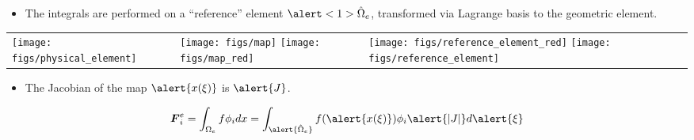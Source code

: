 \begin{frame}[t]
  \begin{block}{}
    \begin{itemize}    
  \item{
    The integrals are performed on a ``reference'' element $\alert<1>{\hat{\Omega}_e}$, transformed via Lagrange basis to the geometric element.
    }
  \end{itemize}
  \end{block}\vspace{-.3in}
  \begin{center}
  \begin{tabular}{lll} \\ 
      \texttt{[image: figs/physical\_element]}
       &
  {
       \texttt{[image: figs/map]}
  }
  {
       \texttt{[image: figs/map\_red]}
  }
       &
  {
       \texttt{[image: figs/reference\_element\_red]}
       }
  {
       \texttt{[image: figs/reference\_element]}
       }
     \end{tabular}
  \end{center}


      {
	\begin{block}{}
	\begin{itemize}    
	\item{
	  The Jacobian of the map $\alert{x(\xi)}$ is $\alert{J}$.
	}
	\end{itemize}
	\end{block}
	\begin{equation}
	  \nonumber
	  \bv{F}^e_{i} = \int_{\Omega_e} f \phi_i dx
	  =  \int_{\alert{\hat{\Omega}_e}}
	  f (\alert{x(\xi)}) \phi_i \alert{|J|} d\alert{\xi}
	\end{equation}
      }

\end{frame}





